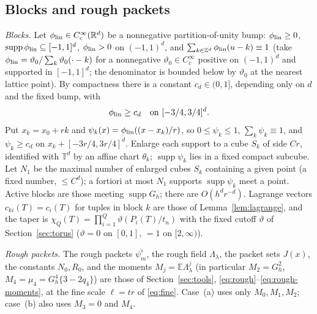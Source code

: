 \documentclass[11pt]{article}
\newcommand{\E}{\mathbb{E}}
\newcommand{\R}{\mathbb{R}}
\newcommand{\Torus}{\mathbb{T}}
\begin{document}
\subsection{Blocks and rough packets}
\emph{Blocks.}  Let \(\phi_{\rm lin}\in C_c^\infty(\R^d)\) be a
nonnegative partition-of-unity bump: \(\phi_{\rm lin}\ge0\),
\(\operatorname{supp}\phi_{\rm lin}\subseteq[-1,1]^d\), \(\phi_{\rm lin}>0\)
on \((-1,1)^d\), and \(\sum_{k\in\mathbb Z^d}\phi_{\rm lin}(u-k)\equiv1\)
(take \(\phi_{\rm lin}=\vartheta_0/\sum_k\vartheta_0(\cdot-k)\) for a
nonnegative \(\vartheta_0\in C_c^\infty\) positive on \((-1,1)^d\) and
supported in \([-1,1]^d\); the denominator is bounded below by
\(\vartheta_0\) at the nearest lattice point).  By compactness there is a
constant \(c_d\in(0,1]\), depending only on \(d\) and the fixed bump, with
\begin{equation}
 \phi_{\rm lin}\ge c_d\quad\text{on }[-3/4,3/4]^d .
 \label{C:eq:cd}
\end{equation}
Put \(x_k=x_0+rk\) and
\(\psi_k(x)=\phi_{\rm lin}((x-x_k)/r)\), so \(0\le\psi_k\le1\),
\(\sum_k\psi_k\equiv1\), and \(\psi_k\ge c_d\) on \(x_k+[-3r/4,3r/4]^d\).
Enlarge each support to a cube \(S_k\) of side \(Cr\), identified with
\(\Torus^d\) by an affine chart \(\theta_k\); \(\operatorname{supp}\psi_k\)
lies in a fixed compact subcube.  Let \(N_1\) be the maximal number of
enlarged cubes \(S_k\) containing a given point (a fixed number, \(\le C^d\)); a
fortiori at most \(N_1\) supports \(\operatorname{supp}\psi_k\) meet a point.
Active blocks are those meeting \(\operatorname{supp}G_h\); there are
\(O(h^dr^{-d})\).  Lagrange vectors \(c_{ki}(T)=c_i(T)\) for tuples in
block \(k\) are those of Lemma~\ref{lem:lagrange}, and the taper
is \(\chi_Q(T)=\prod_{i=1}^Q\vartheta(P_i(T)/t_n)\) with the fixed cutoff
\(\vartheta\) of Section~\ref{sec:torus} (\(\vartheta=0\) on \([0,1]\), \(=1\) on \([2,\infty)\)).

\emph{Rough packets.}  The rough packets \(\psi^\flat_m\), the rough field
\(\Lambda_\lambda\), the packet sets \(J(x)\), the constants \(N_0,R_0\), and
the moments \(M_j=\E\Lambda_\lambda^j\) (in particular \(M_2=G_h^2\),
\(M_4=\mu_4=G_h^4\{3-2q_4\}\)) are those of Section~\ref{sec:tools},
\eqref{eq:rough}--\eqref{eq:rough-moments}, at the fine scale \(\ell=tr\)
of \eqref{eq:fine}.  Case~(a) uses only \(M_0,M_1,M_2\); case~(b) also
uses \(M_3=0\) and \(M_4\).
\end{document}
